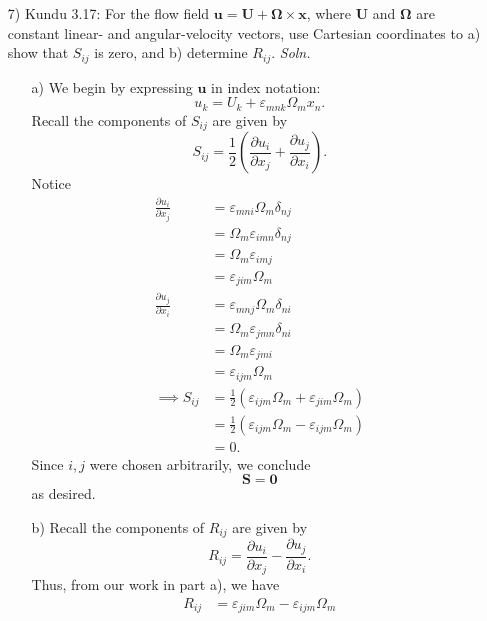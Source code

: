 \documentclass{article}
\begin{document}
\begin{itemize}
    \pagebreak
    \item[7)] Kundu 3.17: For the flow field $\mathbf{u} = \mathbf{U} + \mathbf{\Omega}\times \mathbf{x}$, where $\mathbf{U}$ and $\mathbf{\Omega}$ are constant linear- and angular-velocity vectors, use Cartesian coordinates to a) show that $S_{ij}$ is zero, and b) determine $R_{ij}$.
    \newline\newline
    \textit{Soln.}
    \begin{itemize}
        \item[a)] We begin by expressing $\mathbf{u}$ in index notation:
        \[u_k = U_k + \varepsilon_{mnk}\Omega_mx_n.\]
        Recall the components of $S_{ij}$ are given by
        \[S_{ij} = \frac{1}{2}\left(\frac{\partial u_i}{\partial x_j} + \frac{\partial u_j}{\partial x_i}\right).\]
        Notice
        \begin{align*}
            \frac{\partial u_i}{\partial x_j} &= \varepsilon_{mni}\Omega_m\delta_{nj}\\
            &= \Omega_m\varepsilon_{imn}\delta_{nj}\\
            &= \Omega_m\varepsilon_{imj}\\
            &= \varepsilon_{jim}\Omega_m\\
            \frac{\partial u_j}{\partial x_i} &= \varepsilon_{mnj}\Omega_m\delta_{ni}\\
            &= \Omega_m\varepsilon_{jmn}\delta_{ni}\\
            &= \Omega_m\varepsilon_{jmi}\\
            &= \varepsilon_{ijm}\Omega_m\\
            \implies S_{ij} &= \frac{1}{2}(\varepsilon_{ijm}\Omega_m + \varepsilon_{jim}\Omega_m)\\
            &= \frac{1}{2}(\varepsilon_{ijm}\Omega_m - \varepsilon_{ijm}\Omega_m)\\
            &= 0.
        \end{align*}
        Since $i,j$ were chosen arbitrarily, we conclude
        \[\mathbf{S} = \mathbf{0}\]
        as desired.
        \newline\newline
        \item[b)] Recall the components of $R_{ij}$ are given by
        \[R_{ij} = \frac{\partial u_i}{\partial x_j} - \frac{\partial u_j}{\partial x_i}.\]
        Thus, from our work in part a), we have
        \begin{align*}
            R_{ij} &= \varepsilon_{jim}\Omega_m - \varepsilon_{ijm}\Omega_m\\

\end{align*}
\end{itemize}
\end{itemize}
\end{document}
